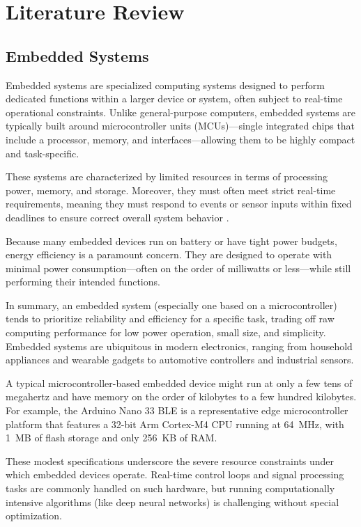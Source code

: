 \chapter{Literature Review}

\section{Embedded Systems}

Embedded systems are specialized computing systems designed to perform dedicated functions within a larger device or system, often subject to real-time operational constraints. Unlike general-purpose computers, embedded systems are typically built around microcontroller units (MCUs)---single integrated chips that include a processor, memory, and interfaces---allowing them to be highly compact and task-specific.

These systems are characterized by limited resources in terms of processing power, memory, and storage. Moreover, they must often meet strict real-time requirements, meaning they must respond to events or sensor inputs within fixed deadlines to ensure correct overall system behavior \cite{techtarget_embedded_system}.

Because many embedded devices run on battery or have tight power budgets, energy efficiency is a paramount concern. They are designed to operate with minimal power consumption---often on the order of milliwatts or less---while still performing their intended functions.

In summary, an embedded system (especially one based on a microcontroller) tends to prioritize reliability and efficiency for a specific task, trading off raw computing performance for low power operation, small size, and simplicity. Embedded systems are ubiquitous in modern electronics, ranging from household appliances and wearable gadgets to automotive controllers and industrial sensors.

A typical microcontroller-based embedded device might run at only a few tens of megahertz and have memory on the order of kilobytes to a few hundred kilobytes. For example, the Arduino Nano 33 BLE is a representative edge microcontroller platform that features a 32-bit Arm Cortex-M4 CPU running at 64~MHz, with 1~MB of flash storage and only 256~KB of RAM.

These modest specifications underscore the severe resource constraints under which embedded devices operate. Real-time control loops and signal processing tasks are commonly handled on such hardware, but running computationally intensive algorithms (like deep neural networks) is challenging without special optimization.

